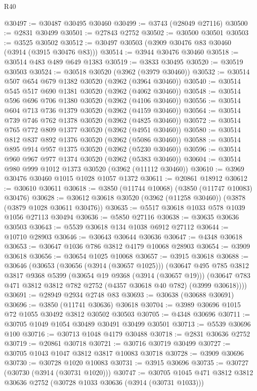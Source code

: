 \begin{lexlean}{R40}
\begin{coremodule}
@30497 := @30487 @30495 @30460
@30499 := @3743 (@28049 @27116)
@30500 := @2831 @30499
@30501 := @27843 @2752
@30502 := @30500 @30501
@30503 := @3525 @30502
@30512 := @30497 @30503 (@3909 @30476 @83 @30460 (@3914 (@3915 @30476 @83)))
@30514 := @3944 @30476 @30460
@30518 := @30514 @483 @489 @649 @1383
@30519 := @3833 @30495
@30520 := @30519 @30503
@30524 := @30518 @30520 (@3962 (@3979 @30460))
@30532 := @30514 @507 @654 @679 @1382 @30520 (@3962 (@3964 @30460))
@30540 := @30514 @545 @517 @690 @1381 @30520 (@3962 (@4062 @30460))
@30548 := @30514 @596 @696 @706 @1380 @30520 (@3962 (@4106 @30460))
@30556 := @30514 @604 @713 @736 @1379 @30520 (@3962 (@4159 @30460))
@30564 := @30514 @739 @746 @762 @1378 @30520 (@3962 (@4825 @30460))
@30572 := @30514 @765 @772 @809 @1377 @30520 (@3962 (@4951 @30460))
@30580 := @30514 @812 @837 @892 @1376 @30520 (@3962 (@5086 @30460))
@30588 := @30514 @895 @914 @957 @1375 @30520 (@3962 (@5230 @30460))
@30596 := @30514 @960 @967 @977 @1374 @30520 (@3962 (@5383 @30460))
@30604 := @30514 @980 @999 @1012 @1373 @30520 (@3962 (@11112 @30460))
@30610 := @3969 @30476 @30460 @1015 @1028 @1057 @1372
@30611 := @20861 @18912
@30612 := @30610 @30611
@30618 := @3850 (@11744 @10068) (@3850 (@11747 @10083) @30476)
@30628 := @30612 @30618 @30520 (@3962 (@11258 @30460)) (@3878 (@3879 @1028 @30611 @30476))
@30635 := @5517 @30618 @1033 @578 @1039 @1056 @27113 @30494
@30636 := @5850 @27116
@30638 := @30635 @30636 @30503
@30643 := @5539 @30618 @134 @1038 @6912 @27112
@30644 := @10710 @28903
@30646 := @30643 @30644 @30636
@30647 := @4348 @30618
@30653 := @30647 @1036 @786 @3812 @4179 @10068 @28903
@30654 := @3909 @30618
@30656 := @30654 @1025 @10068
@30657 := @3915 @30618
@30688 := @30646
    (@30653
      (@30656 (@3914 (@30657 @1025)))
      (@30647
        @495
        @785
        @3812
        @3817
        @9368
        @5399
        (@30654 @19 @9368 (@3914 (@30657 @19)))
        (@30647 @783 @471 @3812 @3812 @782 @2752 (@4357 @30618 @40 @782) (@3999 @30618))))
@30691 := @28949 @2934 @2748 @83
@30693 := @30638 (@30688 @30691)
@30696 := @3850 (@11741 @30636) @30618
@30704 := @3989 @30696 @1015 @72 @1055 @30492 @3812 @30502 @30503
@30705 := @4348 @30696
@30711 := @30705 @1049 @1054 @30489 @30491 @30499 @30501
@30713 := @5539 @30696 @100
@30716 := @30713 @1048 @4179 @30488
@30718 := @2831 @30636 @2752
@30719 := @20861 @30718
@30721 := @30716 @30719 @30499
@30727 := @30705 @1043 @1047 @3812 @3817 @10083 @30718
@30728 := @3909 @30696
@30730 := @30728 @1020 @10083
@30731 := @3915 @30696
@30735 := @30727 (@30730 (@3914 (@30731 @1020)))
@30747 := @30705 @1045 @471 @3812 @3812 @30636 @2752 (@30728 @1033 @30636 (@3914 (@30731 @1033)))

\end{coremodule}
\end{lexlean}
